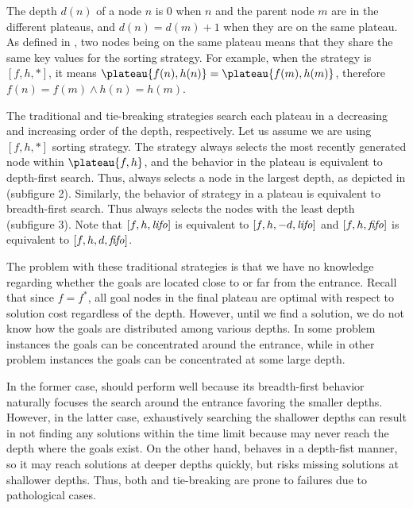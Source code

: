 The depth $d(n)$ of a node $n$ is 0 when $n$ and
the parent node $m$ are in the different plateaus,
and $d(n)=d(m)+1$ when they are on the same plateau.
As defined in , two nodes being on the same plateau
means that they share the same key values for the sorting strategy.
For example, when the strategy is $[f,h,*]$,
it means $\plateau{f(n),h(n)}=\plateau{f(m),h(m)}$, therefore
$f(n) = f(m) \land h(n) = h(m)$.

The traditional \lifo and \fifo tie-breaking strategies
search each plateau in a decreasing and increasing order of the depth, respectively.
Let us assume we are using $[f,h,*]$ sorting strategy.
The \lifo strategy always selects the most recently generated node
within $\plateau{f,h}$, and the behavior in the plateau is equivalent to depth-first search.
Thus, \lifo always selects a node in the largest depth,
as depicted in  (subfigure 2).
Similarly, the behavior of \fifo strategy 
in a plateau is equivalent to breadth-first search. Thus \fifo 
always selects the nodes with the least depth (subfigure 3).
Note that  $[f,h,{\text{\textit{lifo}}}]$ is equivalent to $[f,h,-d,{\text{\textit{lifo}}}]$ and
$[f,h,{\text{\textit{fifo}}}]$ is equivalent to $[f,h,d,{\text{\textit{fifo}}}]$.

The problem with these traditional strategies is that we have no knowledge
regarding whether the goals are located close to or far from the entrance. Recall
that since $f=f^*$, all goal nodes in the final plateau are optimal with respect to solution cost
regardless of the depth.
However, until we find a
solution, we do not know how the goals are distributed among various
depths. In some problem instances the goals can be concentrated around
the entrance, while in other problem instances the goals can be
concentrated at some large depth. %

In the former case, \fifo
should perform well because its breadth-first behavior naturally
focuses the search around the entrance favoring the smaller depths.
However, in the latter case, exhaustively searching
the shallower depths can result in not finding any solutions within
the time limit because \fifo may never reach the depth where the goals
exist.  On the other hand, \lifo behaves in a depth-fist manner, so it
may reach solutions at deeper depths quickly, but risks missing
solutions at shallower depths.  Thus, both \fifo and \lifo tie-breaking
are prone to failures due to pathological cases.

